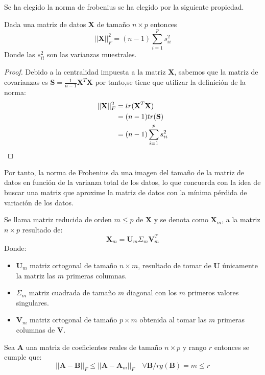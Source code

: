 \noindent Se ha elegido la norma de frobenius se ha elegido por la siguiente propiedad. 
\begin{propo}
Dada una matriz de datos \textbf{X} de tamaño $n\times p$ entonces
\begin{equation}
||\textbf{X}||_F^2=(n-1)\sum_{i=1}^p s_{ii}^2
\end{equation}
Donde las $s_{ii}^2$ son las varianzas muestrales.
\begin{proof}
Debido a la centralidad impuesta a la matriz \textbf{X}, sabemos que la matriz de covarianzas es $\textbf{S}=\frac{1}{n-1}\textbf{X}^T \textbf{X}$ por tanto,se tiene que utilizar la definición de la norma:
\begin{align*}
||\textbf{X}||_F^2 &= tr(\textbf{X}^T\textbf{X})\\
&= (n-1) tr(\textbf{S})\\
&= (n-1) \sum_{i=1}^p s_{ii}^2 \qedhere
\end{align*}
\end{proof}
\end{propo}
\noindent Por tanto, la norma de Frobenius da una imagen del tamaño de la matriz de datos en función de la varianza total de los datos, lo que concuerda con la idea de buscar una matriz que aproxime la matriz de datos con la mínima pérdida de variación de los datos.  
\begin{defi}
Se llama matriz reducida de orden $m\leq p$ de $\textbf{X}$ y se denota como $\textbf{X}_m$, a la matriz $n\times p$ resultado de:
\begin{equation}
\textbf{X}_m=\textbf{U}_m\Sigma_m\textbf{V}^T_m
\end{equation}
Donde:
\begin{itemize}
\item $\textbf{U}_m$ matriz ortogonal de tamaño $n \times m$, resultado de tomar de \textbf{U} únicamente la matriz las $m$ primeras columnas. 
\item $\Sigma_m$  matriz cuadrada de tamaño $m$ diagonal con los $m$ primeros valores singulares. 
\item $\textbf{V}_m$ matriz ortogonal de tamaño $p \times m$ obtenida al tomar las $m$ primeras columnas de \textbf{V}.
\end{itemize}
\end{defi}

\begin{teorema}
Sea \textbf{A} una matriz de coeficientes reales de tamaño $n\times p$ y rango $r$  entonces se cumple que:
\begin{equation}
||\textbf{A}-\textbf{B}||_F\leq ||\textbf{A}-\textbf{A}_m||_F \quad \forall \textbf{B}/ rg(\textbf{B})=m \leq r
\end{equation} 
\end{teorema}

